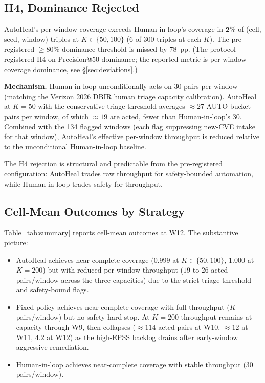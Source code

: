 \subsection{H4, Dominance Rejected}

AutoHeal's per-window coverage exceeds Human-in-loop's coverage in
$\textbf{2\%}$ of (cell, seed, window) triples at $K \in \{50, 100\}$
(6 of 300 triples at each $K$). The pre-registered $\geq 80\%$
dominance threshold is missed by 78~pp. (The protocol registered
H4 on Precision@50 dominance; the reported metric is per-window
coverage dominance, see \S\ref{sec:deviations}.)

\textbf{Mechanism.} Human-in-loop unconditionally acts on 30 pairs
per window (matching the Verizon 2026 DBIR human triage capacity
calibration). AutoHeal at $K = 50$ with the conservative triage
threshold averages $\approx 27$ AUTO-bucket pairs per window, of
which $\approx 19$ are acted, fewer
than Human-in-loop's 30. Combined with the 134 flagged windows
(each flag suppressing new-CVE intake for that window),
AutoHeal's effective per-window throughput is reduced relative to
the unconditional Human-in-loop baseline.

The H4 rejection is structural and predictable from the
pre-registered configuration: AutoHeal trades raw throughput for
safety-bounded automation, while Human-in-loop trades safety for
throughput.

\subsection{Cell-Mean Outcomes by Strategy}

Table~\ref{tab:summary} reports cell-mean outcomes at W12. The
substantive picture:
\begin{itemize}
\item AutoHeal achieves near-complete coverage ($0.999$ at
$K \in \{50, 100\}$, $1.000$ at $K = 200$) but with reduced per-window throughput
($19$ to $26$ acted pairs/window across the three capacities) due to
the strict triage threshold
and safety-bound flags.
\item Fixed-policy achieves near-complete coverage with full
throughput ($K$ pairs/window) but no safety hard-stop. At
$K = 200$ throughput remains at capacity through W9, then
collapses ($\approx 114$ acted pairs at W10, $\approx 12$ at W11,
$4.2$ at W12) as the high-EPSS backlog drains
after early-window aggressive remediation.
\item Human-in-loop achieves near-complete coverage with stable
throughput ($30$ pairs/window).
\end{itemize}

